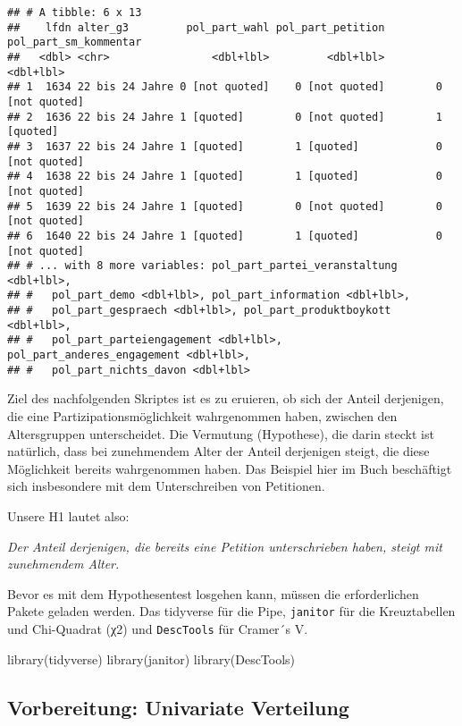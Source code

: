 \documentclass[
]{book}
\newenvironment{Shaded}{\begin{snugshade}}{\end{snugshade}}
\newcommand{\FunctionTok}[1]{\textcolor[rgb]{0.00,0.00,0.00}{#1}}
\newcommand{\NormalTok}[1]{#1}
\begin{document}
\begin{verbatim}
## # A tibble: 6 x 13
##    lfdn alter_g3         pol_part_wahl pol_part_petition pol_part_sm_kommentar
##   <dbl> <chr>                <dbl+lbl>         <dbl+lbl>             <dbl+lbl>
## 1  1634 22 bis 24 Jahre 0 [not quoted]    0 [not quoted]        0 [not quoted]
## 2  1636 22 bis 24 Jahre 1 [quoted]        0 [not quoted]        1 [quoted]    
## 3  1637 22 bis 24 Jahre 1 [quoted]        1 [quoted]            0 [not quoted]
## 4  1638 22 bis 24 Jahre 1 [quoted]        1 [quoted]            0 [not quoted]
## 5  1639 22 bis 24 Jahre 1 [quoted]        0 [not quoted]        0 [not quoted]
## 6  1640 22 bis 24 Jahre 1 [quoted]        1 [quoted]            0 [not quoted]
## # ... with 8 more variables: pol_part_partei_veranstaltung <dbl+lbl>,
## #   pol_part_demo <dbl+lbl>, pol_part_information <dbl+lbl>,
## #   pol_part_gespraech <dbl+lbl>, pol_part_produktboykott <dbl+lbl>,
## #   pol_part_parteiengagement <dbl+lbl>, pol_part_anderes_engagement <dbl+lbl>,
## #   pol_part_nichts_davon <dbl+lbl>
\end{verbatim}

Ziel des nachfolgenden Skriptes ist es zu eruieren, ob sich der Anteil derjenigen, die eine Partizipationsmöglichkeit wahrgenommen haben, zwischen den Altersgruppen unterscheidet. Die Vermutung (Hypothese), die darin steckt ist natürlich, dass bei zunehmendem Alter der Anteil derjenigen steigt, die diese Möglichkeit bereits wahrgenommen haben. Das Beispiel hier im Buch beschäftigt sich insbesondere mit dem Unterschreiben von Petitionen.

Unsere H1 lautet also:

\emph{Der Anteil derjenigen, die bereits eine Petition unterschrieben haben, steigt mit zunehmendem Alter.}

Bevor es mit dem Hypothesentest losgehen kann, müssen die erforderlichen Pakete geladen werden. Das tidyverse für die Pipe, \texttt{janitor} für die Kreuztabellen und Chi-Quadrat (χ2) und \texttt{DescTools} für Cramer´s V.

\begin{Shaded}
\begin{Highlighting}[]
\FunctionTok{library}\NormalTok{(tidyverse)}
\FunctionTok{library}\NormalTok{(janitor)}
\FunctionTok{library}\NormalTok{(DescTools)}
\end{Highlighting}
\end{Shaded}

\hypertarget{vorbereitung-univariate-verteilung}{%
\subsection{Vorbereitung: Univariate Verteilung}\label{vorbereitung-univariate-verteilung}}
\end{document}
